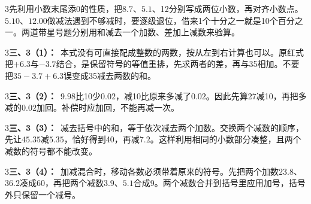\documentclass[multi=snippet,border={5bp 20bp 5bp 5bp}]{standalone}
\newenvironment{snippet}[3]{\begin{minipage}{#1bp}\color{answerred}\fontsize{#2}{#3}\selectfont\raggedright}{\end{minipage}}
\begin{document}
\begin{snippet}{505}{11.5}{14}\begin{multicols}{3}\raggedcolumns 先利用小数末尾添0的性质，把\(8.7\)\allowbreak 、\(5.1\)\allowbreak 、12分别写成两位小数，再对齐小数点。\(5.10\)\allowbreak 、\(12.00\)\allowbreak 做减法遇到不够减时，要逐级退位，借来1个十分之一就是10个百分之一。两道带星号题分别用和减去一个加数、差加上减数来验算。\end{multicols}\end{snippet}
\begin{snippet}{505}{11.5}{14}\begin{multicols}{3}\raggedcolumns \textbf{三、3（1）：}\ 本式没有可直接配成整数的两数，按从左到右计算也可以。原红式把\(+6.3\)\allowbreak 与\(-3.7\)\allowbreak 结合，是保留符号的等值重排，先求两者的差，再与35相加。不要把\(35-3.7+6.3\)\allowbreak 误变成35减去两数的和。\end{multicols}\end{snippet}
\begin{snippet}{505}{11.5}{14}\begin{multicols}{3}\raggedcolumns \textbf{三、3（2）：}\ \(9.98\)\allowbreak 比10少\(0.02\)\allowbreak ，减10比原来多减了\(0.02\)\allowbreak 。因此先算27减10，再把多减的\(0.02\)\allowbreak 加回。补偿时应加回，不能再减一次。\end{multicols}\end{snippet}
\begin{snippet}{505}{11.5}{14}\begin{multicols}{3}\raggedcolumns \textbf{三、3（3）：}\ 减去括号中的和，等于依次减去两个加数。交换两个减数的顺序，先让\(45.35\)\allowbreak 减\(5.35\)\allowbreak ，恰好得到40，再减\(7.2\)\allowbreak 。这样利用相同的小数部分凑整，且两个减数的符号都不能改变。\end{multicols}\end{snippet}
\begin{snippet}{505}{11.5}{14}\begin{multicols}{3}\raggedcolumns \textbf{三、3（4）：}\ 加减混合时，移动各数必须带着原来的符号。先把两个加数\(23.8\)\allowbreak 、\(36.2\)\allowbreak 凑成60，再把两个减数\(3.9\)\allowbreak 、\(5.1\)\allowbreak 合成9。两个减数合并到括号里应用加号，括号外只保留一个减号。\end{multicols}\end{snippet}
\end{document}
